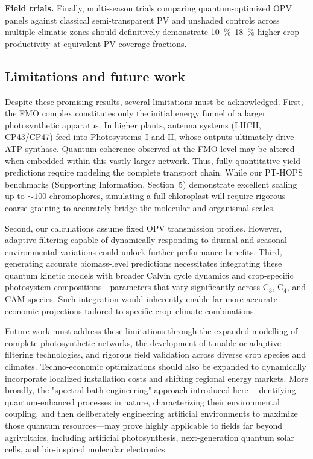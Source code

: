 \textbf{Field trials.} Finally, multi-season trials comparing quantum-optimized OPV panels against classical semi-transparent PV and unshaded controls across multiple climatic zones should definitively demonstrate \SIrange{10}{18}{\percent} higher crop productivity at equivalent PV coverage fractions.

\subsection{Limitations and future work}

Despite these promising results, several limitations must be acknowledged. First, the FMO complex constitutes only the initial energy funnel of a larger photosynthetic apparatus. In higher plants, antenna systems (LHCII, CP43/CP47) feed into Photosystems~I and II, whose outputs ultimately drive ATP synthase. Quantum coherence observed at the FMO level may be altered when embedded within this vastly larger network. Thus, fully quantitative yield predictions require modeling the complete transport chain. While our PT-HOPS benchmarks (Supporting Information, Section~5) demonstrate excellent scaling up to $\sim 100$ chromophores, simulating a full chloroplast will require rigorous coarse-graining to accurately bridge the molecular and organismal scales.

Second, our calculations assume fixed OPV transmission profiles. However, adaptive filtering capable of dynamically responding to diurnal and seasonal environmental variations could unlock further performance benefits. Third, generating accurate biomass-level predictions necessitates integrating these quantum kinetic models with broader Calvin cycle dynamics and crop-specific photosystem compositions---parameters that vary significantly across C$_3$, C$_4$, and CAM species. Such integration would inherently enable far more accurate economic projections tailored to specific crop--climate combinations.

Future work must address these limitations through the expanded modelling of complete photosynthetic networks, the development of tunable or adaptive filtering technologies, and rigorous field validation across diverse crop species and climates. Techno-economic optimizations should also be expanded to dynamically incorporate localized installation costs and shifting regional energy markets. More broadly, the "spectral bath engineering" approach introduced here---identifying quantum-enhanced processes in nature, characterizing their environmental coupling, and then deliberately engineering artificial environments to maximize those quantum resources---may prove highly applicable to fields far beyond agrivoltaics, including artificial photosynthesis, next-generation quantum solar cells, and bio-inspired molecular electronics.
